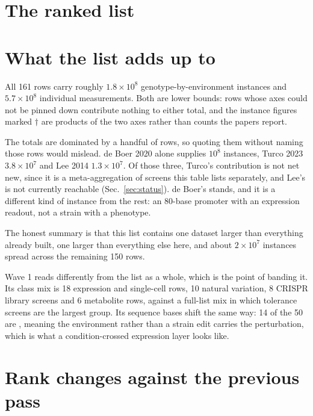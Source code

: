 
\section{The ranked list}\label{sec:list}



\clearpage


\clearpage
\section{What the list adds up to}\label{sec:counts}



All 161 rows carry roughly $1.8\times10^8$ genotype-by-environment instances and
$5.7\times10^8$ individual measurements. Both are lower bounds: rows whose axes could not
be pinned down contribute nothing to either total, and the instance figures marked
$\dagger$ are products of the two axes rather than counts the papers report.

The totals are dominated by a handful of rows, so quoting them without naming those rows
would mislead. de Boer 2020 alone supplies $10^8$ instances, Turco 2023 $3.8\times10^7$ and
Lee 2014 $1.3\times10^7$. Of those three, Turco's contribution is not net new, since it is a
meta-aggregation of screens this table lists separately, and Lee's is not currently reachable
(Sec.~\ref{sec:status}). de Boer's stands, and it is a different kind of instance from the
rest: an 80-base promoter with an expression readout, not a strain with a phenotype.

The honest summary is that this list contains one dataset larger than everything already
built, one larger than everything else here, and about $2\times10^7$ instances spread across
the remaining 150 rows.

Wave 1 reads differently from the list as a whole, which is the point of banding it. Its
class mix is 18 expression and single-cell rows, 10 natural variation, 8 CRISPR library
screens and 6 metabolite rows, against a full-list mix in which tolerance screens are the
largest group. Its sequence bases shift the same way: 14 of the 50 are
, meaning the environment rather than a strain edit carries the
perturbation, which is what a condition-crossed expression layer looks like.

\clearpage
\section{Rank changes against the previous pass}\label{sec:moves}


